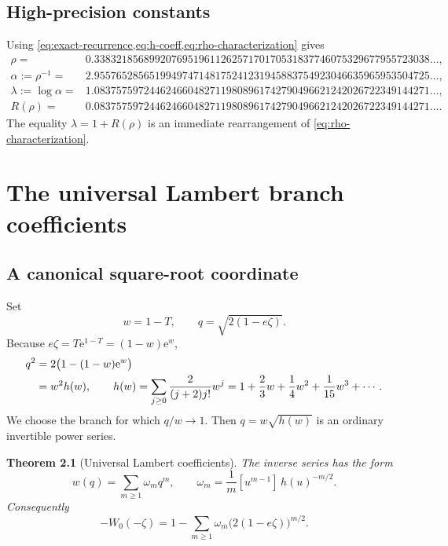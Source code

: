 \documentclass[11pt,a4paper,oneside,openany]{book}
\newtheorem{theorem}{Theorem}[chapter]
\theoremstyle{definition}
\theoremstyle{remark}
\newcommand{\e}{\mathrm e}
\newcommand{\Coeff}[3]{[ #1^{#2}]\,#3}
\begin{document}
\section{High-precision constants}
Using \cref{eq:exact-recurrence,eq:h-coeff,eq:rho-characterization} gives
\begin{align}
 \rho={}&0.3383218568992076951961126257170170531837746075329677955723038\ldots,
 \label{eq:rho-numeric}\\
 \alpha:=\rho^{-1}={}&2.9557652856519949747148175241231945883754923046635965953504725\ldots,
 \label{eq:alpha-numeric}\\
 \lambda:=\log\alpha={}&1.0837575972446246604827119808961742790496621242026722349144271\ldots,
 \label{eq:lambda-numeric}\\
 R(\rho)={}&0.0837575972446246604827119808961742790496621242026722349144271\ldots.
 \label{eq:Rrho-numeric}
\end{align}
The equality $\lambda=1+R(\rho)$ is an immediate rearrangement of
\cref{eq:rho-characterization}.

\chapter{The universal Lambert branch coefficients}
\label{ch:universal-lambert}

\section{A canonical square-root coordinate}
Set
\begin{equation}
 w=1-T,
 \qquad
 q=\sqrt{2(1-e\zeta)}.
 \label{eq:wq-def}
\end{equation}
Because $e\zeta=T\e^{1-T}=(1-w)\e^w$,
\begin{align}
 q^2
 &=2\bigl(1-(1-w)\e^w\bigr)\notag\\
 &=w^2 h(w),
 \qquad
 h(w)=\sum_{j\ge0}\frac{2}{(j+2)j!}w^j
      =1+\frac23w+\frac14w^2+\frac1{15}w^3+\cdots .
 \label{eq:q-w-h}
\end{align}
We choose the branch for which $q/w\to1$.  Then $q=w\sqrt{h(w)}$ is an ordinary
invertible power series.

\begin{theorem}[Universal Lambert coefficients]
\label{thm:omega}
The inverse series has the form
\begin{equation}
 w(q)=\sum_{m\ge1}\omega_mq^m,
 \qquad
 \boxed{
 \omega_m=\frac1m\Coeff u{m-1}{h(u)^{-m/2}}.}
 \label{eq:omega-master}
\end{equation}
Consequently
\begin{equation}
 -W_0(-\zeta)=1-\sum_{m\ge1}\omega_m
        \bigl(2(1-e\zeta)\bigr)^{m/2}.
 \label{eq:W-universal-expansion}
\end{equation}
\end{theorem}
\end{document}
